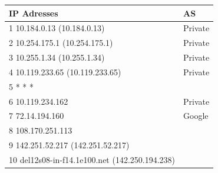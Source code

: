 \documentclass{article}
\begin{document}
\begin{table}[]
\begin{tabular}{|l|l|}
\hline
\textbf{IP Adresses}                                                        & \textbf{AS}                                                           \\ \hline
1  10.184.0.13 (10.184.0.13)                                                & Private                                                               \\ \hline
2  10.254.175.1 (10.254.175.1)                                              & Private                                                               \\ \hline
3  10.255.1.34 (10.255.1.34)                                                & Private                                                               \\ \hline
4  10.119.233.65 (10.119.233.65)                                            & Private                                                               \\ \hline
5  * * *                                                                    &                                                                       \\ \hline
6  10.119.234.162                                                           & Private                                                               \\ \hline
7  72.14.194.160                                                            & Google                                                                \\ \hline
8  108.170.251.113                                                          & \cellcolor[HTML]{F6F6F6}{\color[HTML]{5D5D5D} Google}                 \\ \hline
9  142.251.52.217 (142.251.52.217)                                          & \cellcolor[HTML]{F6F6F6}{\color[HTML]{5D5D5D} Google}                 \\ \hline
10  del12s08-in-f14.1e100.net (142.250.194.238)                             & \cellcolor[HTML]{F6F6F6}{\color[HTML]{5D5D5D} Google}  \\ \hline
\end{tabular}
\end{table}
\clearpage
\clearpage
\end{document}

